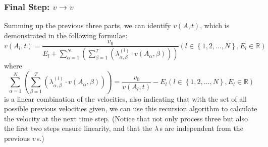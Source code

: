 \documentclass{article}
\theoremstyle{definition}
\theoremstyle{remark}
\numberwithin{equation}{section}
\begin{document}
	\subsubsection{Final Step: \(v\to v\)}
	Summing up the previous three parts, we can identify $v(A,t)$, which is demonstrated in the following formulae:
	$$v\left( A_l,t \right) =\frac{v_0}{E_l+\sum\limits_{\alpha =1}^N{\left( \sum\limits_{\beta =1}^T{\left( \lambda _{\alpha ,\beta}^{\left( l \right)}\cdot v\left( A_{\alpha},\beta \right) \right)} \right)}}\left( l\in \left\{ 1,2,...,N \right\} ,E_l\in \mathbb{R} \right)$$
	where
	$$\sum_{\alpha =1}^N{\left( \sum_{\beta =1}^T{\left( \lambda _{\alpha ,\beta}^{\left( l \right)}\cdot v\left( A_{\alpha},\beta \right) \right)} \right)}=\frac{v_0}{v\left( A_l,t \right)}-E_l\left( l\in \left\{ 1,2,...,N \right\} ,E_l\in \mathbb{R} \right)$$
	is a linear combination of the velocities, also indicating that with the set of all possible previous velocities given, we can use this recursion algorithm to calculate the velocity at the next time step. (Notice that not only process three but also the first two steps ensure linearity, and that the \(\lambda\,\)s are independent from the previous \(v\,\)s.)
\end{document}
